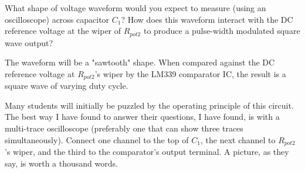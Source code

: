 

What shape of voltage waveform would you expect to measure (using an oscilloscope) across capacitor $C_1$?  How does this waveform interact with the DC reference voltage at the wiper of $R_{pot2}$ to produce a pulse-width modulated square wave output?







The waveform will be a "sawtooth" shape.  When compared against the DC reference voltage at $R_{pot2}$'s wiper by the LM339 comparator IC, the result is a square wave of varying duty cycle.







Many students will initially be puzzled by the operating principle of this circuit.  The best way I have found to answer their questions, I have found, is with a multi-trace oscilloscope (preferably one that can show three traces simultaneously).  Connect one channel to the top of $C_1$, the next channel to $R_{pot2}$'s wiper, and the third to the comparator's output terminal.  A picture, as they say, is worth a thousand words.



